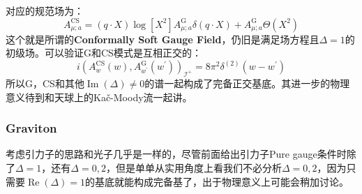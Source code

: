 对应的规范场为：
\begin{equation}
	A_{\mu;a}^\mathrm{CS}=(q\cdot X)\log[X^2]A_{\mu;a}^\mathrm{G}\delta(q\cdot X)+A_{\mu;a}^\mathrm{G}\Theta\left(X^2\right)
\end{equation}
这个就是所谓的\textbf{Conformally Soft Gauge Field}，仍旧是满足场方程且$\Delta=1$的初级场。可以验证G和CS模式是互相正交的：
\begin{equation}
	i(A_w^\mathrm{CS}(w),A_{w^{\prime}}^\mathrm{G}(w^{\prime}))_{\mathcal{I}^+}=8\pi^2\delta^{(2)}(w-w^{\prime})
\end{equation}
所以G，CS和其他$\operatorname{Im}(\Delta)\neq 0$的谱一起构成了完备正交基底。其进一步的物理意义待到和天球上的Ka\v{c}-Moody流一起讲。
\subsubsection{Graviton}
考虑引力子的思路和光子几乎是一样的，尽管前面给出引力子Pure gauge条件时除了$\Delta=1$，还有$\Delta=0,2$，但是单单从实用角度上看我们不必分析$\Delta=0,2$，因为只需要$\operatorname{Re}(\Delta)=1$的基底就能构成完备基了，出于物理意义上可能会稍加讨论。

